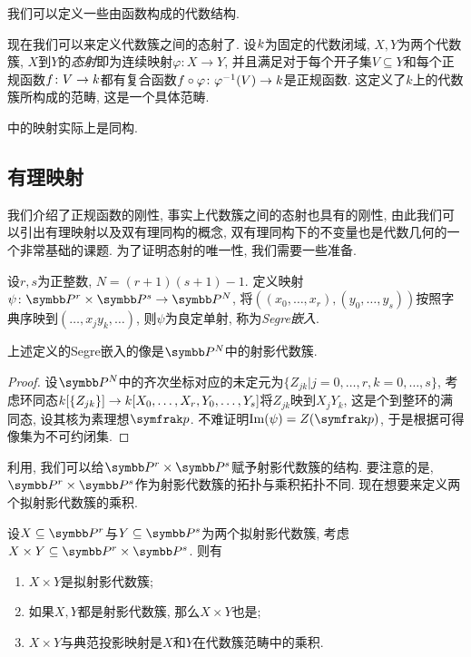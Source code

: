 我们可以定义一些由函数构成的代数结构.%

现在我们可以来定义代数簇之间的态射了. 设$k$为固定的代数闭域, $X, Y$为两个代数簇, $X$到$Y$的\emph{态射}即为连续映射$\varphi\colon X\to Y$, 并且满足对于每个开子集$V\subseteq Y$和每个正规函数$f\colon V\to k$都有复合函数$f\circ\varphi\colon\varphi^{-1}(V)\to k$是正规函数. 这定义了$k$上的代数簇所构成的范畴, 这是一个具体范畴.

中的映射实际上是同构.%

\subsection{有理映射}

我们介绍了正规函数的刚性, 事实上代数簇之间的态射也具有的刚性, 由此我们可以引出有理映射以及双有理同构的概念, 双有理同构下的不变量也是代数几何的一个非常基础的课题. 为了证明态射的唯一性, 我们需要一些准备.

设$r, s$为正整数, $N=(r+1)(s+1)-1$. 定义映射$\psi\colon \PP^r\times\PP^s\to\PP^N$, 将$((x_0, \dotsc, x_r), (y_0, \dotsc, y_s))$按照字典序映到$(\dotsc, x_jy_k, \dotsc)$, 则$\psi$为良定单射, 称为\emph{Segre嵌入}.

\begin{proposition}\label{prop:segreembedding}
    上述定义的Segre嵌入的像是$\PP^N$中的射影代数簇.
\end{proposition}

\begin{proof}
    设$\PP^N$中的齐次坐标对应的未定元为$\{Z_{jk}\vert j=0, \dotsc, r, k=0, \dotsc, s\}$, 考虑环同态$k [\{Z_{jk}\}]\to k [X_0, \dotsc, X_r, Y_0, \dotsc, Y_s]$将$Z_{jk}$映到$X_jY_k$, 这是个到整环的满同态, 设其核为素理想$\ideal{p}$. 不难证明$\Im (\psi)=Z(\ideal{p})$, 于是根据可得像集为不可约闭集.
\end{proof}

利用, 我们可以给$\PP^r\times\PP^s$赋予射影代数簇的结构. 要注意的是, $\PP^r\times\PP^s$作为射影代数簇的拓扑与乘积拓扑不同. 现在想要来定义两个拟射影代数簇的乘积.

\begin{proposition}\label{prop:projectiveproduct}
    设$X\subseteq\PP^r$与$Y\subseteq\PP^s$为两个拟射影代数簇, 考虑$X\times Y\subseteq \PP^r\times\PP^s$. 则有
    \begin{enumerate}
        \item $X\times Y$是拟射影代数簇;
        \item 如果$X, Y$都是射影代数簇, 那么$X\times Y$也是;
        \item\label{enum:prop-projective-product-3} $X\times Y$与典范投影映射是$X$和$Y$在代数簇范畴中的乘积.
    \end{enumerate}
\end{proposition}

